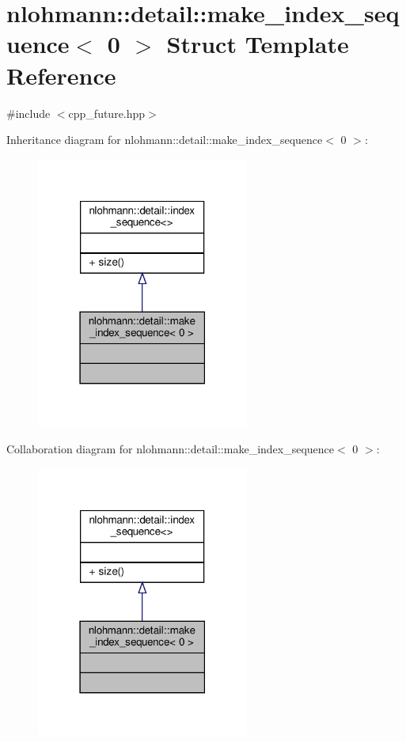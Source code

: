 \hypertarget{structnlohmann_1_1detail_1_1make__index__sequence_3_010_01_4}{}\section{nlohmann\+:\+:detail\+:\+:make\+\_\+index\+\_\+sequence$<$ 0 $>$ Struct Template Reference}
\label{structnlohmann_1_1detail_1_1make__index__sequence_3_010_01_4}


{\ttfamily \#include $<$cpp\+\_\+future.\+hpp$>$}



Inheritance diagram for nlohmann\+:\+:detail\+:\+:make\+\_\+index\+\_\+sequence$<$ 0 $>$\+:\nopagebreak
\begin{figure}[H]
\begin{center}
\leavevmode
\includegraphics[width=198pt]{structnlohmann_1_1detail_1_1make__index__sequence_3_010_01_4__inherit__graph}
\end{center}
\end{figure}


Collaboration diagram for nlohmann\+:\+:detail\+:\+:make\+\_\+index\+\_\+sequence$<$ 0 $>$\+:\nopagebreak
\begin{figure}[H]
\begin{center}
\leavevmode
\includegraphics[width=198pt]{structnlohmann_1_1detail_1_1make__index__sequence_3_010_01_4__coll__graph}
\end{center}
\end{figure}
